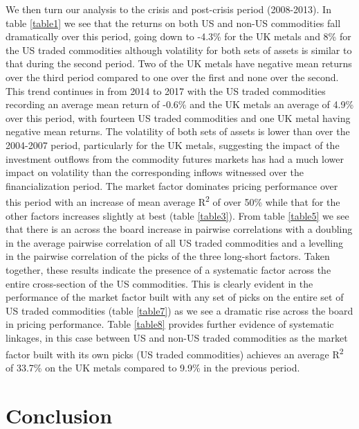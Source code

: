\documentclass[12pt,]{article}
\begin{document}
We then turn our analysis to the crisis and post-crisis period
(2008-2013). In table \ref{table1} we see that the returns on both US
and non-US commodities fall dramatically over this period, going down to
-4.3\% for the UK metals and 8\% for the US traded commodities although
volatility for both sets of assets is similar to that during the second
period. Two of the UK metals have negative mean returns over the third
period compared to one over the first and none over the second. This
trend continues in from 2014 to 2017 with the US traded commodities
recording an average mean return of -0.6\% and the UK metals an average
of 4.9\% over this period, with fourteen US traded commodities and one
UK metal having negative mean returns. The volatility of both sets of
assets is lower than over the 2004-2007 period, particularly for the UK
metals, suggesting the impact of the investment outflows from the
commodity futures markets has had a much lower impact on volatility than
the corresponding inflows witnessed over the financialization period.
The market factor dominates pricing performance over this period with an
increase of mean average R\textsuperscript{2} of over 50\% while that
for the other factors increases slightly at best (table \ref{table3}).
From table \ref{table5} we see that there is an across the board
increase in pairwise correlations with a doubling in the average
pairwise correlation of all US traded commodities and a levelling in the
pairwise correlation of the picks of the three long-short factors. Taken
together, these results indicate the presence of a systematic factor
across the entire cross-section of the US commodities. This is clearly
evident in the performance of the market factor built with any set of
picks on the entire set of US traded commodities (table \ref{table7}) as
we see a dramatic rise across the board in pricing performance. Table
\ref{table8} provides further evidence of systematic linkages, in this
case between US and non-US traded commodities as the market factor built
with its own picks (US traded commodities) achieves an average
R\textsuperscript{2} of 33.7\% on the UK metals compared to 9.9\% in the
previous period.

\hypertarget{conclusion}{%
\section{Conclusion}\label{conclusion}}
\end{document}

